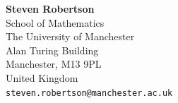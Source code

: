 \documentclass{article}
\theoremstyle{definition}
\numberwithin{equation}{subsection}
\begin{document}
\raisebox{-10ex}
{
    \begin{minipage}{10cm}
        \textbf{Steven Robertson}\\
        School of Mathematics\\
        The University of Manchester\\
        Alan Turing Building\\
        Manchester, M13 9PL\\
        United Kingdom\\
        \texttt{steven.robertson@manchester.ac.uk}  
    \end{minipage}
} 
\end{document}
